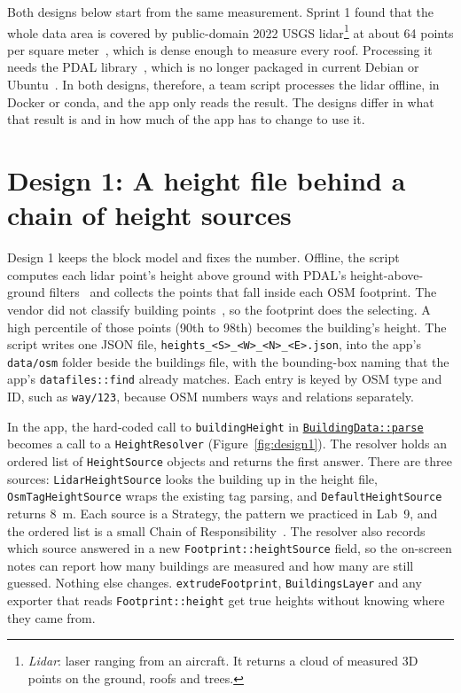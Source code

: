 \documentclass[11pt,letterpaper]{article}
\newcommand{\repo}{https://github.com/csci-3081-20-f26/csci-3081-students-sprint-1-prototype-and-research-group-9}
\newcommand{\code}[2]{\href{\repo/blob/633898d5006ebe1ad46569516fb69f0e32bee508/#1}{\texttt{#2}}}
\begin{document}
Both designs below start from the same measurement. Sprint 1 found that the whole data area is covered by public-domain 2022 USGS lidar\footnote{\emph{Lidar}: laser ranging from an aircraft. It returns a cloud of measured 3D points on the ground, roofs and trees.} at about 64 points per square meter~\cite{threedep,opentopo}, which is dense enough to measure every roof. Processing it needs the PDAL library~\cite{pdalhag}, which is no longer packaged in current Debian or Ubuntu~\cite{repologypdal}. In both designs, therefore, a team script processes the lidar offline, in Docker or conda, and the app only reads the result. The designs differ in what that result is and in how much of the app has to change to use it.

\section*{Design 1: A height file behind a chain of height sources}

Design 1 keeps the block model and fixes the number. Offline, the script computes each lidar point's height above ground with PDAL's height-above-ground filters~\cite{pdalhag} and collects the points that fall inside each OSM footprint. The vendor did not classify building points~\cite{woolpert}, so the footprint does the selecting. A high percentile of those points (90th to 98th) becomes the building's height. The script writes one JSON file, \texttt{heights\_<S>\_<W>\_<N>\_<E>.json}, into the app's \texttt{data/osm} folder beside the buildings file, with the bounding-box naming that the app's \texttt{datafiles::find} already matches. Each entry is keyed by OSM type and ID, such as \texttt{way/123}, because OSM numbers ways and relations separately.

In the app, the hard-coded call to \texttt{buildingHeight} in \code{src/Buildings.cpp\#L244}{BuildingData::parse} becomes a call to a \texttt{HeightResolver} (Figure~\ref{fig:design1}). The resolver holds an ordered list of \texttt{HeightSource} objects and returns the first answer. There are three sources: \texttt{LidarHeightSource} looks the building up in the height file, \texttt{OsmTagHeightSource} wraps the existing tag parsing, and \texttt{DefaultHeightSource} returns 8~m. Each source is a Strategy, the pattern we practiced in Lab~9, and the ordered list is a small Chain of Responsibility~\cite{gof}. The resolver also records which source answered in a new \texttt{Footprint::heightSource} field, so the on-screen notes can report how many buildings are measured and how many are still guessed. Nothing else changes. \texttt{extrudeFootprint}, \texttt{BuildingsLayer} and any exporter that reads \texttt{Footprint::height} get true heights without knowing where they came from.
\end{document}

